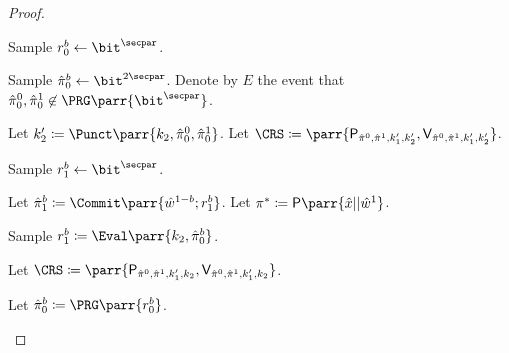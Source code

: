 \begin{proof}
\begin{hybrids}
        \item Sample \(r_0^b \gets \bit^\secpar\).

        \item Sample \(\hat{\pi}_0^b \gets \bit^{2\secpar}\).
        Denote by \(E\) the event that \(\hat{\pi}_0^0, \hat{\pi}_0^1 \not\in \PRG\parr{\bit^\secpar}\).

        \item Let \(k'_2 \coloneqq \Punct\parr{k_2, \hat{\pi}_0^0, \hat{\pi}_0^1}\).
        Let \(\CRS \coloneqq \parr{\mathsf{P}_{\hat{\pi}^0,\hat{\pi}^1,k'_1,k'_2}, \mathsf{V}_{\hat{\pi}^0,\hat{\pi}^1,k'_1,k'_2}}\).

        \item Sample \(r_1^b \gets \bit^\secpar\).

        \item Let \(\hat{\pi}_1^b \coloneqq \Commit\parr{\hat{w}^{1-b}; r_1^b}\).
        Let \(\pi^* \coloneqq \mathsf{P}\parr{\hat{x}||\hat{w}^1}\).

        \item Sample \(r_1^b \coloneqq \Eval\parr{k_2,\hat{\pi}_0^b}\).

        \item Let \(\CRS \coloneqq \parr{\mathsf{P}_{\hat{\pi}^0,\hat{\pi}^1,k'_1,k_2}, \mathsf{V}_{\hat{\pi}^0,\hat{\pi}^1,k'_1,k_2}}\).

        \item Let \(\hat{\pi}_0^b \coloneqq \PRG\parr{r_0^b}\).
        

\end{hybrids}
\end{proof}
